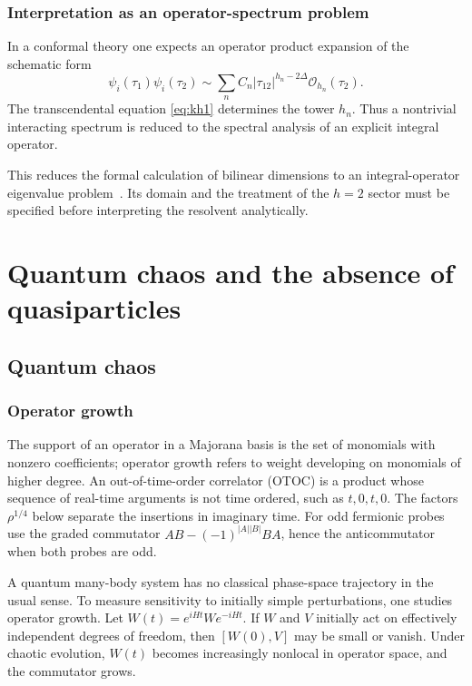 \documentclass[11pt]{article}
\numberwithin{equation}{section}
\theoremstyle{exposition}
\theoremstyle{result}
\newcommand{\cO}{\mathcal O}
\begin{document}
\subsubsection{Interpretation as an operator-spectrum problem}

In a conformal theory one expects an operator product expansion of the schematic form
\begin{equation*}
\psi_i(\tau_1)\psi_i(\tau_2)
\sim
\sum_n C_n |\tau_{12}|^{h_n-2\Delta}\cO_{h_n}(\tau_2).
\end{equation*}
The transcendental equation \eqref{eq:kh1} determines the tower $h_n$. Thus a nontrivial interacting spectrum is reduced to the spectral analysis of an explicit integral operator.

This reduces the formal calculation of bilinear dimensions to an integral-operator eigenvalue problem~\cite{PolchinskiRosenhaus}. Its domain and the treatment of the $h=2$ sector must be specified before interpreting the resolvent analytically.

\section[Chaos and quasiparticles]{Quantum chaos and the absence of quasiparticles}\label{sec:chaos}

\subsection{Quantum chaos}

\subsubsection{Operator growth}


The support of an operator in a Majorana basis is the set of monomials with nonzero coefficients; operator growth refers to weight developing on monomials of higher degree. An out-of-time-order correlator (OTOC) is a product whose sequence of real-time arguments is not time ordered, such as $t,0,t,0$. The factors $\rho^{1/4}$ below separate the insertions in imaginary time. For odd fermionic probes use the graded commutator $AB-(-1)^{|A||B|}BA$, hence the anticommutator when both probes are odd.

A quantum many-body system has no classical phase-space trajectory in the usual sense. To measure sensitivity to initially simple perturbations, one studies operator growth. Let $W(t)=e^{iHt}We^{-iHt}$. If $W$ and $V$ initially act on effectively independent degrees of freedom, then $[W(0),V]$ may be small or vanish. Under chaotic evolution, $W(t)$ becomes increasingly nonlocal in operator space, and the commutator grows.
\end{document}
